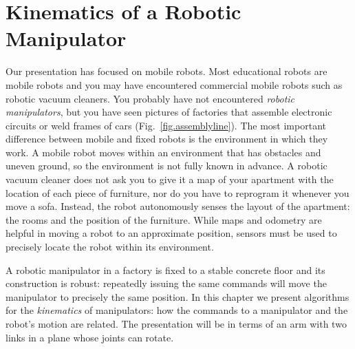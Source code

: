 
\chapter{Kinematics of a Robotic Manipulator}\label{ch.kinematics}


Our presentation has focused on mobile robots. Most educational robots are mobile robots and you may have encountered commercial mobile robots such as robotic vacuum cleaners. You probably have not encountered \emph{robotic manipulators}, but you have seen pictures of factories that assemble electronic circuits or weld frames of cars (Fig.~\ref{fig.assemblyline}). The most important difference between mobile and fixed robots is the environment in which they work. A mobile robot moves within an environment that has obstacles and uneven ground, so the environment is not fully known in advance. A robotic vacuum cleaner does not ask you to give it a map of your apartment with the location of each piece of furniture, nor do you have to reprogram it whenever you move a sofa. Instead, the robot autonomously senses the layout of the apartment: the rooms and the position of the furniture. While maps and odometry are helpful in moving a robot to an approximate position, sensors must be used to precisely locate the robot within its environment.

A robotic manipulator in a factory is fixed to a stable concrete floor and its construction is robust: repeatedly issuing the same commands will move the manipulator to precisely the same position. In this chapter we present algorithms for the \emph{kinematics} of manipulators: how the commands to a manipulator and the robot's motion are related. The presentation will be in terms of an arm with two links in a plane whose joints can rotate.

